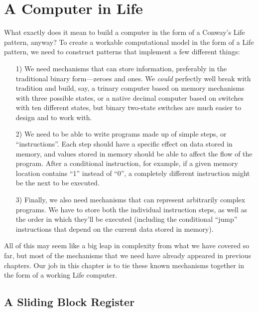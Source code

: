 \section{A Computer in Life}\label{sec:computer_in_life}

What exactly does it mean to build a computer in the form of a Conway's Life pattern, anyway? To create a workable computational model in the form of a Life pattern, we need to construct patterns that implement a few different things:\smallskip

\begin{enumerate}
	\item[1)] We need mechanisms that can store information, preferably in the traditional binary form---zeroes and ones. We \emph{could} perfectly well break with tradition and build, say, a trinary computer based on memory mechanisms with three possible states, or a native decimal computer based on switches with ten different states, but binary two-state switches are much easier to design and to work with.\smallskip
	
	\item[2)] We need to be able to write programs made up of simple steps, or ``instructions''. Each step should have a specific effect on data stored in memory, and values stored in memory should be able to affect the flow of the program. After a conditional instruction, for example, if a given memory location contains ``1'' instead of ``0'', a completely different instruction might be the next to be executed.\smallskip
	
	\item[3)] Finally, we also need mechanisms that can represent arbitrarily complex programs. We have to store both the individual instruction steps, as well as the order in which they'll be executed (including the conditional ``jump'' instructions that depend on the current data stored in memory).\smallskip
\end{enumerate}

All of this may seem like a big leap in complexity from what we have covered so far, but most of the mechanisms that we need have already appeared in previous chapters. Our job in this chapter is to tie these known mechanisms together in the form of a working Life computer.


\subsection{A Sliding Block Register}\label{sec:sliding_block_register}

